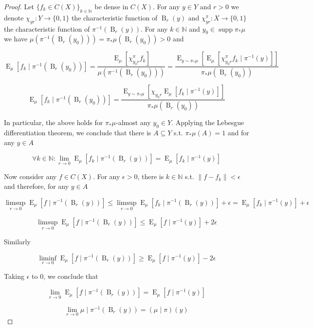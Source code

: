 \documentclass[aop,preprint]{imsart}
\numberwithin{equation}{section}
\theoremstyle{definition}
\theoremstyle{plain}
\newcommand{\Nats}{\mathbb{N}}
\newcommand{\N}[1]{\lVert #1 \rVert}
\newcommand{\Sq}[2]{\{#1\}_{#2 \in \Nats}}
\newcommand{\B}{\operatorname{B}}
\DeclareMathOperator{\E}{E}
\DeclareMathOperator{\Sp}{supp}
\begin{document}
\begin{proof}

Let $\Sq{f_k \in C\left(X\right)}{k}$ be dense in $C\left(X\right)$. For any $y \in Y$ and $r > 0$ we denote $\chi_{yr}: Y \rightarrow \{0,1\}$ the characteristic function of $\B_r\left(y\right)$ and $\chi^\pi_{yr}: X \rightarrow \{0,1\}$ the characteristic function of $\pi^{-1}\left(\B_r\left(y\right)\right)$. For any $k \in \Nats$ and $y_0 \in \Sp \pi_* \mu$ we have $\mu\left(\pi^{-1}\left(\B_r\left(y_0\right)\right)\right) = \pi_*\mu\left(\B_r\left(y_0\right)\right) > 0$ and

$$\E_{\mu}\left[f_k \mid \pi^{-1}\left(\B_r\left(y_0\right)\right)\right] = \frac{\E_{\mu}\left[\chi^\pi_{y_0r} f_k\right]}{\mu\left(\pi^{-1}\left(\B_r\left(y_0\right)\right)\right)} = \frac{\E_{y \sim \pi_* \mu}\left[\E_{\mu}\left[\chi^\pi_{y_0r} f_k \mid \pi^{-1}\left(y\right)\right]\right]}{\pi_*\mu\left(\B_r\left(y_0\right)\right)}$$

$$\E_{\mu}\left[f_k \mid \pi^{-1}\left(\B_r\left(y_0\right)\right)\right] = \frac{\E_{y \sim \pi_* \mu}\left[\chi_{y_0r} \E_{\mu}\left[f_k \mid \pi^{-1}\left(y\right)\right]\right]}{\pi_*\mu\left(\B_r\left(y_0\right)\right)}$$

In particular, the above holds for $\pi_* \mu$-almost any $y_0 \in Y$. Applying the Lebesgue differentiation theorem, we conclude that there is $A \subseteq Y$ s.t. $\pi_*\mu\left(A\right) = 1$ and for any $y \in A$

$$\forall k \in \Nats: \lim_{r \rightarrow 0} \E_{\mu}\left[f_k \mid \pi^{-1}\left(\B_r\left(y\right)\right)\right] = \E_{\mu}\left[f_k \mid \pi^{-1}\left(y\right)\right]$$

Now consider any $f \in C\left(X\right)$. For any $\epsilon > 0$, there is $k \in \Nats$ s.t. $\N{f-f_k} < \epsilon$ and therefore, for any $y \in A$

$$\limsup_{r \rightarrow 0} \E_{\mu}\left[f \mid \pi^{-1}\left(\B_r\left(y\right)\right)\right] \leq \limsup_{r \rightarrow 0} \E_{\mu}\left[f_k \mid \pi^{-1}\left(\B_r\left(y\right)\right)\right] + \epsilon = \E_{\mu}\left[f_k \mid \pi^{-1}\left(y\right)\right] + \epsilon  $$

$$\limsup_{r \rightarrow 0} \E_{\mu}\left[f \mid \pi^{-1}\left(\B_r\left(y\right)\right)\right] \leq \E_{\mu}\left[f \mid \pi^{-1}\left(y\right)\right] + 2\epsilon$$

Similarly

$$\liminf_{r \rightarrow 0} \E_{\mu}\left[f \mid \pi^{-1}\left(\B_r\left(y\right)\right)\right] \geq \E_{\mu}\left[f \mid \pi^{-1}\left(y\right)\right] - 2\epsilon$$

Taking $\epsilon$ to 0, we conclude that

$$\lim_{r \rightarrow 0} \E_{\mu}\left[f \mid \pi^{-1}\left(\B_r\left(y\right)\right)\right] = \E_{\mu}\left[f \mid \pi^{-1}\left(y\right)\right]$$

$$\lim_{r \rightarrow 0} \mu \mid \pi^{-1}\left(\B_r\left(y\right)\right) = \left(\mu \mid \pi\right)\left(y\right)$$
\end{proof}
\end{document}

